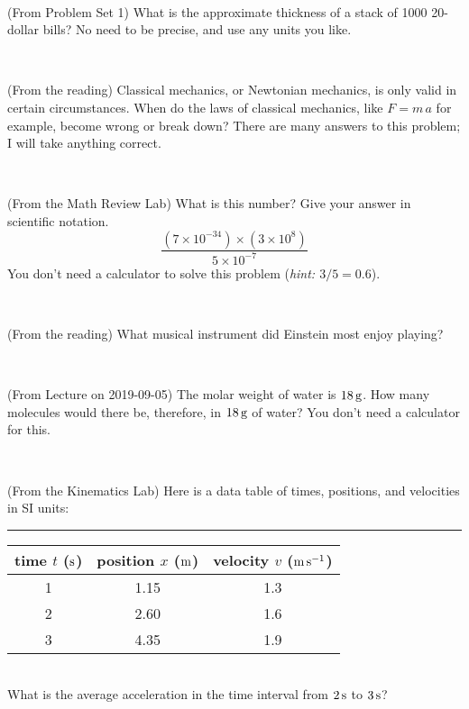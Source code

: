 \documentclass[12pt, letterpaper]{article}
\begin{document}
\vfill ~

\begin{problem} (From Problem Set 1)
What is the approximate thickness of a stack of 1000 20-dollar bills?
No need to be precise, and use any units you like.
\end{problem}


\vfill ~

\begin{problem} (From the reading)
Classical mechanics, or Newtonian mechanics, is only valid in certain
circumstances. When do the laws of classical mechanics, like $F =
m\,a$ for example, become wrong or break down? There are many answers
to this problem; I will take anything correct.
\end{problem}


\vfill ~

\begin{problem} (From the Math Review Lab)
What is this number? Give your answer in scientific notation.
$$
\frac{(7\times10^{-34})\times(3\times10^8)}{5\times10^{-7}}
$$
You don't need a calculator to solve this problem (\textit{hint: $3/5=0.6$}).
\end{problem}


\vfill ~


\clearpage


\begin{problem} (From the reading)
What musical instrument did Einstein most enjoy playing?
\end{problem}


\vfill ~

\begin{problem} (From Lecture on 2019-09-05)
The molar weight of water is $18\,\mathrm{g}$. How many molecules would there
be, therefore, in $18\,\mathrm{g}$ of water? You don't need a calculator for
this.
\end{problem}


\vfill ~

\begin{problem} (From the Kinematics Lab)
Here is a data table of times, positions, and velocities in SI units:\\
\rule{1.0in}{0pt}\begin{tabular}{c|c|c}
time $t$ ($\mathrm{s}$) & position $x$ ($\mathrm{m}$) & velocity $v$ ($\mathrm{m}\,\mathrm{s}^{-1}$) \\
\hline
1 & 1.15 & 1.3 \\
2 & 2.60 & 1.6 \\
3 & 4.35 & 1.9 \\
\hline
\end{tabular}\\
What is the average acceleration in the time interval from $2\,\mathrm{s}$ to $3\,\mathrm{s}$?
\end{problem}
\end{document}
